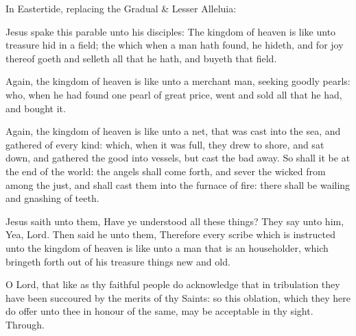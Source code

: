\begin{rubric}
{In Eastertide, replacing the Gradual \& Lesser Alleluia:}
\end{rubric}

\vspace{-1ex}


\label{CommonNeitherVirginMartyrGospel}
 Jesus spake this parable unto his disciples: The kingdom of heaven is like unto treasure hid in a field; the which when a man hath found, he hideth, and for joy thereof goeth and selleth all that he hath, and buyeth that field.

Again, the kingdom of heaven is like unto a merchant man, seeking goodly pearls: who, when he had found one pearl of great price, went and sold all that he had, and bought it.

Again, the kingdom of heaven is like unto a net, that was cast into the sea, and gathered of every kind: which, when it was full, they drew to shore, and sat down, and gathered the good into vessels, but cast the bad away. So shall it be at the end of the world: the angels shall come forth, and sever the wicked from among the just, and shall cast them into the furnace of fire: there shall be wailing and gnashing of teeth.

Jesus saith unto them, Have ye understood all these things? They say unto him, Yea, Lord. Then said he unto them, Therefore every scribe which is instructed unto the kingdom of heaven is like unto a man that is an householder, which bringeth forth out of his treasure things new and old.


\secret
{} O Lord, that like as thy faithful people do acknowledge that in tribulation they have been succoured by the merits of thy Saints: so this oblation, which they here do offer unto thee in honour of the same, may be acceptable in thy sight. Through.


